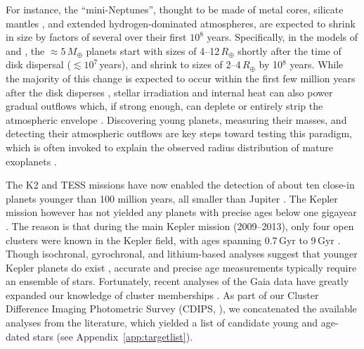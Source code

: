 \documentclass[12pt,modern,twocolumn,tighten]{aastex63}
\begin{document}
For instance, the ``mini-Neptunes'', thought to be made of metal
cores, silicate mantles \citep{kite_atmosphere_2020}, and extended
hydrogen-dominated atmospheres, are expected to shrink
in size by factors of several over their first $10^8$ years.
Specifically, in the models of \citet{owen_atmospheres_2016} and
\citet{owen_constraining_2020}, the $\approx5\,M_\oplus$ planets start
with sizes of 4--12\,$R_\oplus$ shortly after the time of disk
dispersal ($\lesssim$$10^7$\,years), and shrink to sizes of
2--4\,$R_\oplus$ by 10$^8$ years.  While the majority of this change
is expected to occur within the first few million years after the disk
disperses \citep{ikoma_situ_2012}, stellar
irradiation and internal heat can also power gradual outflows
which, if strong enough, can deplete or entirely strip the atmospheric
envelope \citep{Owen_Wu_2013,ginzburg_corepowered_2018}.
Discovering young planets, measuring their masses, and detecting their
atmospheric outflows are key steps toward testing this paradigm, which
is often invoked to explain the observed radius distribution of mature
exoplanets \citep{Fulton_et_al_2017}.

The K2 and TESS missions have now enabled the detection of about ten
close-in planets younger than 100 million years, all smaller than
Jupiter
\citep{Mann_K2_33b_2016,David_et_al_2017,david_four_2019,newton_tess_2019,bouma_cluster_2020,plavchan_planet_2020,rizzuto_tess_2020,martioli_aumicbc_2021}.
The Kepler mission however has not yielded any planets with precise
ages below one gigayear \citep{Meibom_et_al_2013}.  The reason is that
during the main Kepler mission (2009--2013), only four open clusters
were known in the Kepler field,
with ages spanning 0.7\,Gyr to 9\,Gyr \citep{meibom_kepler_2011}.
Though isochronal, gyrochronal, and lithium-based analyses suggest
that younger Kepler planets do exist
\citep{berger_identifying_2018,david_sizes_2021}, accurate and precise
age measurements typically require an ensemble of stars.  Fortunately,
recent analyses of the Gaia data have greatly expanded our knowledge
of cluster memberships \citep[{\it
e.g.},][]{CantatGaudin2018a,Zari2018,KounkelCovey2019,Meingast2021,Kerr2021}.
As part of our Cluster Difference Imaging Photometric Survey (CDIPS,
\citealt{bouma_cdipsI_2019}), we concatenated the available analyses
from the literature, which yielded a list of candidate young and
age-dated stars (see Appendix~\ref{app:targetlist}).
\end{document}
